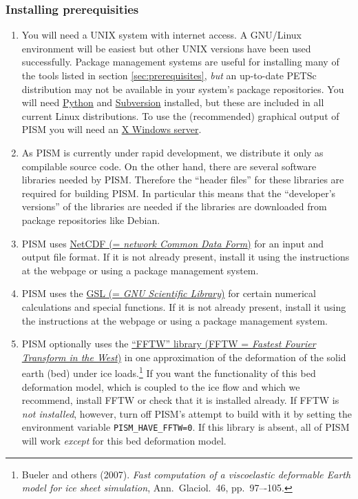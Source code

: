 \documentclass[11pt,final]{amsart}
\begin{document}
\subsubsection{Installing prerequisities}
\renewcommand{\labelenumi}{\textbf{\arabic{enumi}.}~}
\begin{enumerate}
\item You will need a UNIX system with internet access. A GNU/Linux environment will be easiest but other UNIX versions have been
  used successfully. Package management systems are useful for installing many of the tools listed in section
  \ref{sec:prerequisites}, \emph{but} an up-to-date PETSc distribution may not be available in your system's package
  repositories. You will need \href{http://www.python.org/}{Python} and \href{http://subversion.tigris.org/}{Subversion}
  installed, but these are included in all current Linux distributions. To use the (recommended) graphical output of PISM you will
  need an \href{http://www.x.org/}{X Windows server}.

\item As PISM is currently under rapid development, we distribute it only as compilable source code. On the other hand, there are
  several software libraries needed by PISM. Therefore the ``header files'' for these libraries are required for building PISM. In
  particular this means that the ``developer's versions'' of the libraries are needed if the libraries are downloaded from package
  repositories like Debian.

\item PISM uses \href{http://www.unidata.ucar.edu/software/netcdf/}{NetCDF (= \emph{network Common Data Form})} for
  an input and output file format. If it is not already present, install it using the instructions at the webpage or using a
  package management system.

\item PISM uses the \href{http://www.gnu.org/software/gsl/}{GSL (= \emph{GNU Scientific Library})} for certain numerical calculations and special functions. If it is not already present, install it using the
  instructions at the webpage or using a package management system.

\item PISM optionally uses the \href{http://www.fftw.org/}{``FFTW'' library (FFTW = \emph{Fastest Fourier Transform in the
      West})} in one approximation of the deformation of the solid earth (bed) under
  ice loads.\footnote{Bueler and others (2007). \emph{Fast computation of a viscoelastic deformable Earth model for ice sheet simulation}, Ann.~Glaciol.~46, pp.~97–-105.}  If you want the functionality of this bed deformation model, which is coupled to the ice flow and which we
  recommend, install FFTW or check that it is installed already.  If FFTW is \emph{not installed}, however, turn off PISM's attempt
  to build with it by setting the environment variable \texttt{PISM_HAVE_FFTW=0}.  If this library is absent, all of PISM will work
  \emph{except} for this bed deformation model.


\end{enumerate}
\end{document}
